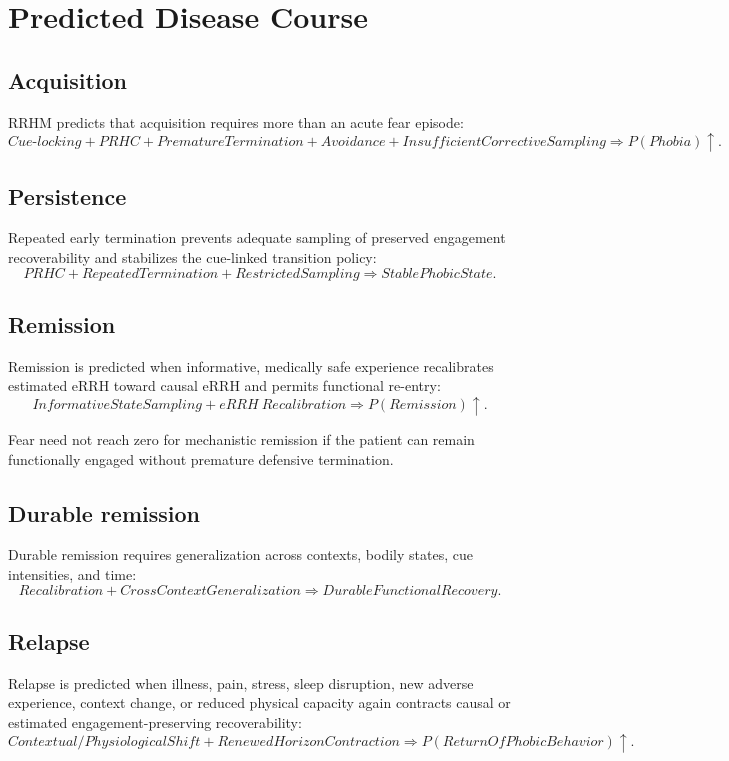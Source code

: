 \documentclass[11pt]{article}
\begin{document}
\section{Predicted Disease Course}
\subsection{Acquisition}
RRHM predicts that acquisition requires more than an acute fear episode:
\[
Cue\text{-}locking + PRHC + PrematureTermination + Avoidance + InsufficientCorrectiveSampling
\Rightarrow P(Phobia)\uparrow.
\]

\subsection{Persistence}
Repeated early termination prevents adequate sampling of preserved engagement recoverability and stabilizes the cue-linked transition policy:
\[
PRHC + RepeatedTermination + RestrictedSampling
\Rightarrow StablePhobicState.
\]

\subsection{Remission}
Remission is predicted when informative, medically safe experience recalibrates estimated eRRH toward causal eRRH and permits functional re-entry:
\[
InformativeStateSampling + eRRH\ Recalibration
\Rightarrow P(Remission)\uparrow.
\]

Fear need not reach zero for mechanistic remission if the patient can remain functionally engaged without premature defensive termination.

\subsection{Durable remission}
Durable remission requires generalization across contexts, bodily states, cue intensities, and time:
\[
Recalibration + CrossContextGeneralization
\Rightarrow DurableFunctionalRecovery.
\]

\subsection{Relapse}
Relapse is predicted when illness, pain, stress, sleep disruption, new adverse experience, context change, or reduced physical capacity again contracts causal or estimated engagement-preserving recoverability:
\[
Contextual/PhysiologicalShift + RenewedHorizonContraction
\Rightarrow P(ReturnOfPhobicBehavior)\uparrow.
\]
\end{document}
